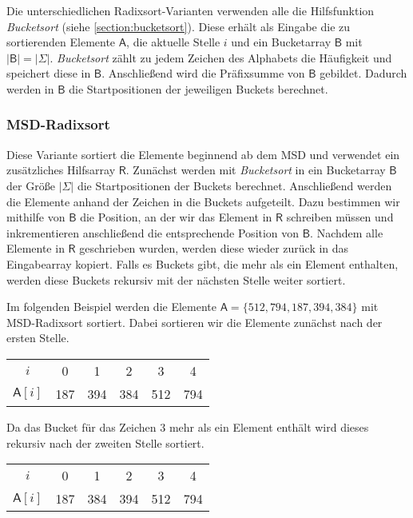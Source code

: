 Die unterschiedlichen Radixsort-Varianten verwenden alle die Hilfsfunktion \emph{Bucketsort} (siehe \cref{section:bucketsort}).
Diese erhält als Eingabe die zu sortierenden Elemente $\mathsf{A}$, die aktuelle Stelle $i$ und ein Bucketarray
$\mathsf{B}$ mit $|\mathsf{B}| = |\Sigma|$. \emph{Bucketsort} zählt zu jedem Zeichen des Alphabets die Häufigkeit
und speichert diese in $\mathsf{B}$.
Anschließend wird die Präfixsumme von $\mathsf{B}$ gebildet.
Dadurch werden in $\mathsf{B}$ die Startpositionen der jeweiligen Buckets berechnet.

\subsubsection{MSD-Radixsort}
\label{sort:radix:msd}

Diese Variante sortiert die Elemente beginnend ab dem MSD und verwendet ein zusätzliches Hilfsarray $\mathsf{R}$.
Zunächst werden mit \emph{Bucketsort} in ein Bucketarray $\mathsf{B}$ der Größe $|\Sigma|$ die Startpositionen
der Buckets berechnet. Anschließend werden die Elemente anhand der Zeichen in die Buckets aufgeteilt.
Dazu bestimmen wir mithilfe von $\mathsf{B}$ die Position, an der wir das Element in $\mathsf{R}$ schreiben müssen und
inkrementieren anschließend die entsprechende Position von $\mathsf{B}$.
Nachdem alle Elemente in $\mathsf{R}$ geschrieben wurden, werden diese wieder zurück in das Eingabearray kopiert.
Falls es Buckets gibt, die mehr als ein Element enthalten, werden diese Buckets rekursiv mit der nächsten
Stelle weiter sortiert.

Im folgenden Beispiel werden die Elemente $\mathsf{A}=\{512, 794, 187, 394, 384\}$ mit MSD-Radixsort sortiert.
Dabei sortieren wir die Elemente zunächst nach der ersten Stelle. 

\begin{table}[H]
	\centering
	\begin{tabular}{c|| c | c c | c | c }
		$i$ & 0 & 1 & 2 & 3 & 4 \\
		$\mathsf{A}[i]$ & 187 & 394 & 384 & 512 & 794
	\end{tabular}
	\label{tab:radix:msd:step_1}
\end{table}

Da das Bucket für das Zeichen $3$ mehr als ein Element enthält wird dieses rekursiv nach der zweiten Stelle sortiert.

\begin{table}[H]
	\centering
	\begin{tabular}{c|| c | c | c | c | c }
		$i$ & 0 & 1 & 2 & 3 & 4 \\
		$\mathsf{A}[i]$ & 187 & 384 & 394 & 512 & 794
	\end{tabular}
	\label{tab:radix:msd:step_2}
\end{table}

